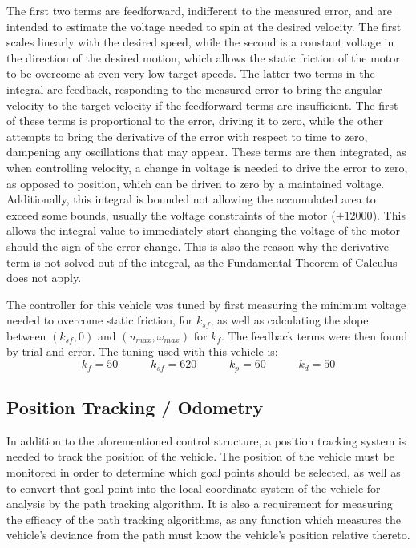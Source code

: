 \documentclass[mla7]{mla}
\begin{document}
\begin{paper}
The first two terms are feedforward, indifferent to the measured error, and are intended to estimate the voltage needed to spin at the desired velocity. The first scales linearly with the desired speed, while the second is a constant voltage in the direction of the desired motion, which allows the static friction of the motor to be overcome at even very low target speeds. The latter two terms in the integral are feedback, responding to the measured error to bring the angular velocity to the target velocity if the feedforward terms are insufficient. The first of these terms is proportional to the error, driving it to zero, while the other attempts to bring the derivative of the error with respect to time to zero, dampening any oscillations that may appear. These terms are then integrated, as when controlling velocity, a change in voltage is needed to drive the error to zero, as opposed to position, which can be driven to zero by a maintained voltage. Additionally, this integral is bounded not allowing the accumulated area to exceed some bounds, usually the voltage constraints of the motor ($\pm12000$). This allows the integral value to immediately start changing the voltage of the motor should the sign of the error change. This is also the reason why the derivative term is not solved out of the integral, as the Fundamental Theorem of Calculus does not apply. 

The controller for this vehicle was tuned by first measuring the minimum voltage needed to overcome static friction, for $k_{sf}$, as well as calculating the slope between $(k_{sf}, 0)$ and $(u_{max},\omega_{max})$ for $k_f$. The feedback terms were then found by trial and error. The tuning used with this vehicle is:
\begin{equation}
k_f=50\hspace{35pt}
k_{sf}=620 \hspace{35pt}
k_p=60 \hspace{35pt}
k_d=50
\nonumber
\end{equation}

\subsection{Position Tracking / Odometry}

In addition to the aforementioned control structure, a position tracking system is needed to track the position of the vehicle. The position of the vehicle must be monitored in order to determine which goal points should be selected, as well as to convert that goal point into the local coordinate system of the vehicle for analysis by the path tracking algorithm. It is also a requirement for measuring the efficacy of the path tracking algorithms, as any function which measures the vehicle's deviance from the path must know the vehicle's position relative thereto.


\end{paper}
\end{document}
